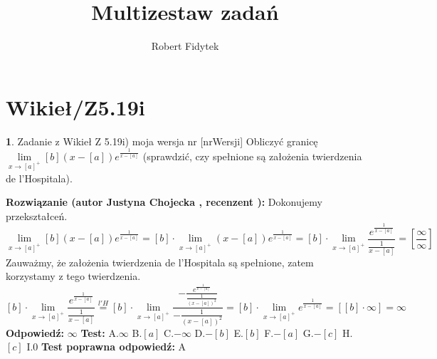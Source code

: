 \documentclass[12pt, a4paper]{article}
\title{Multizestaw zadań}
\author{Robert Fidytek}
\date{}
\theoremstyle{definition} %
\newtheorem{zad}{}
\newcommand{\kategoria}[1]{\section{#1}} %
\newcommand{\zadStart}[1]{\begin{zad}#1\newline} %
\newcommand{\zadStop}{\end{zad}}   %
\newcommand{\rozwStart}[2]{\noindent \textbf{Rozwiązanie (autor #1 , recenzent #2): }\newline} %
\newcommand{\rozwStop}{\newline}                                            %
\newcommand{\odpStart}{\noindent \textbf{Odpowiedź:}\newline}    %
\newcommand{\odpStop}{\newline}                                             %
\newcommand{\testStart}{\noindent \textbf{Test:}\newline} %
\newcommand{\testStop}{\newline} %
\newcommand{\kluczStart}{\noindent \textbf{Test poprawna odpowiedź:}\newline} %
\newcommand{\kluczStop}{\newline} %
\begin{document}
\maketitle


\kategoria{Wikieł/Z5.19i}
\zadStart{Zadanie z Wikieł Z 5.19i) moja wersja nr [nrWersji]}
Obliczyć granicę $\lim\limits_{x\to [a]^{+}}[b]\left(x-[a]\right)e^{\frac{1}{x-[a]}}$ (sprawdzić, czy spełnione są założenia twierdzenia de l'Hospitala).
\zadStop
\rozwStart{Justyna Chojecka}{}
Dokonujemy przekształceń.
$$\lim\limits_{x\to [a]^{+}}[b]\left(x-[a]\right)e^{\frac{1}{x-[a]}}=[b]\cdot\lim\limits_{x\to [a]^{+}}\left(x-[a]\right)e^{\frac{1}{x-[a]}}=[b]\cdot\lim\limits_{x\to [a]^{+}}\frac{e^{\frac{1}{x-[a]}}}{\frac{1}{x-[a]}}=\left[\frac{\infty}{\infty}\right]$$
Zauważmy, że założenia twierdzenia de l'Hospitala są spełnione, zatem korzystamy z tego twierdzenia.
$$[b]\cdot\lim\limits_{x\to [a]^{+}}\frac{e^{\frac{1}{x-[a]}}}{\frac{1}{x-[a]}}\overset{l'H}{=}[b]\cdot\lim\limits_{x\to [a]^{+}}\frac{-\frac{e^{\frac{1}{x-[a]}}}{\frac{1}{(x-[a])^{2}}}}{-\frac{1}{(x-[a])^{2}}}=[b]\cdot\lim\limits_{x\to [a]^{+}}e^{\frac{1}{x-[a]}}=\left[ [b]\cdot \infty\right]=\infty$$
\rozwStop
\odpStart
$\infty$
\odpStop
\testStart
A.$\infty$
B.$[a]$
C.$-\infty$
D.$-[b]$
E.$[b]$
F.$-[a]$
G.$-[c]$
H.$[c]$
I.$0$
\testStop
\kluczStart
A
\kluczStop
\end{document}
